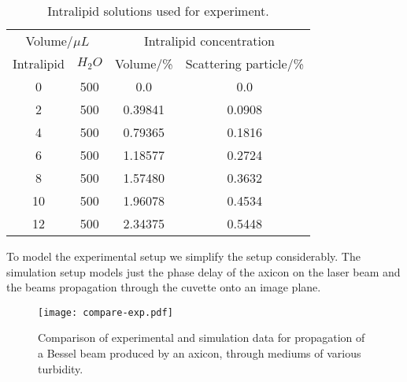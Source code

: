\begin{table}[!ht]
\centering
    \begin{tabular}{cc|cc}
        \hline
        \multicolumn{2}{c|}{Volume/$\mu L$} & \multicolumn{2}{|c}{Intralipid concentration}                       \\
        Intralipid                & $H_2O$  & Volume/\%      & Scattering particle/\% \\ \hline
        \multicolumn{1}{c|}{0}    & 500     & \multicolumn{1}{c|}{0.0}       & 0.0                                    \\
        \multicolumn{1}{c|}{2}    & 500     & \multicolumn{1}{c|}{0.39841} & 0.0908                                \\
        \multicolumn{1}{c|}{4}    & 500     & \multicolumn{1}{c|}{0.79365} & 0.1816                                \\
        \multicolumn{1}{c|}{6}    & 500     & \multicolumn{1}{c|}{1.18577} & 0.2724                                \\
        \multicolumn{1}{c|}{8}    & 500     & \multicolumn{1}{c|}{1.57480} & 0.3632                                \\
        \multicolumn{1}{c|}{10}   & 500     & \multicolumn{1}{c|}{1.96078} & 0.4534                                \\
        \multicolumn{1}{c|}{12}   & 500     & \multicolumn{1}{c|}{2.34375} & 0.5448                                \\ \hline
    \end{tabular}
    \caption{Intralipid solutions used for experiment.}
    \label{tab:intra}
\end{table}


To model the experimental setup we simplify the setup considerably.
The simulation setup models just the phase delay of the axicon on the laser beam and the beams propagation through the cuvette onto an image plane. 

\begin{figure}[!ht]
\centering
\texttt{[image: compare-exp.pdf]}
\caption{Comparison of experimental and simulation data for propagation of a Bessel beam produced by an axicon, through mediums of various turbidity.}
\label{fig:compareexpbessel}
\end{figure}



